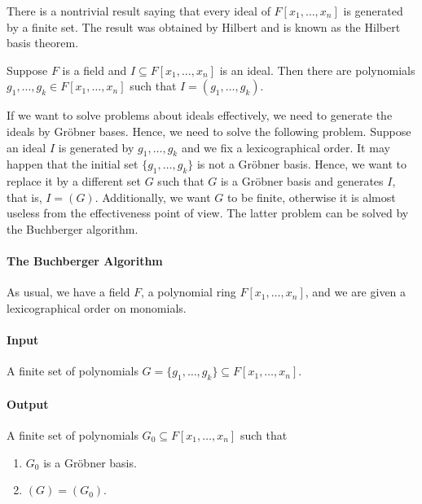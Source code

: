 There is a nontrivial result saying that every ideal of $F[x_1,\ldots,x_n]$ is generated by a finite set.
The result was obtained by Hilbert and is known as the Hilbert basis theorem.

\begin{claim}
Suppose $F$ is a field and $I\subseteq F[x_1,\ldots,x_n]$ is an ideal.
Then there are polynomials $g_1,\ldots,g_k\in F[x_1,\ldots,x_n]$ such that $I = (g_1,\ldots,g_k)$.
\end{claim}

If we want to solve problems about ideals effectively, we need to generate the ideals by Gr\"obner bases.
Hence, we need to solve the following problem.
Suppose an ideal $I$ is generated by $g_1,\ldots,g_k$ and we fix a lexicographical order.
It may happen that the initial set $\{g_1,\ldots,g_k\}$ is not a Gr\"obner basis.
Hence, we want to replace it by a different set $G$ such that $G$ is a Gr\"obner basis and generates $I$, that is, $I = (G)$.
Additionally, we want $G$ to be finite, otherwise it is almost useless from the effectiveness point of view.
The latter problem can be solved by the Buchberger algorithm.


\paragraph{The Buchberger Algorithm}

As usual, we have a field $F$, a polynomial ring $F[x_1,\ldots,x_n]$, and we are given a lexicographical order on monomials.

\paragraph{Input}

A finite set of polynomials $G = \{g_1,\ldots,g_k\}\subseteq F[x_1,\ldots,x_n]$.

\paragraph{Output}

A finite set of polynomials $G_0\subseteq F[x_1,\ldots,x_n]$ such that
\begin{enumerate}
\item $G_0$ is a Gr\"obner basis.

\item $(G) = (G_0)$.
\end{enumerate}

